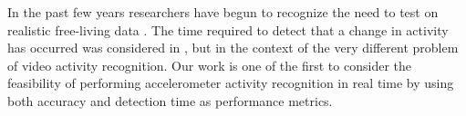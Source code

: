 In the past few years researchers have begun to recognize the need to test on
realistic free-living data \cite{gu09} \cite{kwapitz10} \cite{strohrmann11}
\cite{wu09}. The time required to detect that a change in activity has occurred
was considered in \cite{grauman12} \cite{song06}, but in the context of
the very different problem of video activity recognition. Our work is one of the
first to consider the feasibility of performing accelerometer activity
recognition in real time by using both accuracy and detection time as
performance metrics.
